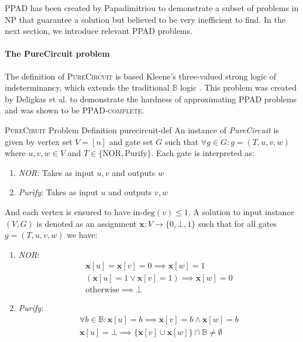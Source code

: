 \textsc{PPAD} has been created by Papadimitriou \cite{papadimitriou_ComplexityParityArgument_1994}
to demonstrate a subset of problems in \textsc{NP} that guarantee
a solution but believed to be very inefficient to find.
In the next section,
we introduce relevant \textsc{PPAD} problems.

\paragraph{The PureCircuit problem}
\label{par:pure-circ-def}

The definition of \textsc{PureCircuit} is based Kleene's three-valued strong logic of indeterminancy,
which extends the traditional $\mathbb{B}$ logic \cite{kleene_IntroductionMetamathematics_2009}.
This problem was created by Deligkas et al. \cite{deligkas_PureCircuitTightInapproximability_2024}
to demonstrate the hardness of approximating \textsc{PPAD} problems and was shown to be \textsc{PPAD-complete}.


\begin{definitionbox}{\textsc{PureCiruit} Problem Definition \cite{deligkas_PureCircuitTightInapproximability_2024}}{purecircuit-def}
An instance of \textit{PureCircuit} is given by vertex set $V= [n]$ and gate set $G$ such that
$\forall g \in G: g=(T,u,v,w)$ where $u,v,w \in V$ and $T \in \{\text{NOR}, \text{Purify}\}$.
Each gate is interpreted as:
\begin{enumerate}
    \item \textit{NOR}: Takes as input $u,v$ and outputs $w$
    \item \textit{Purify}: Takes as input $u$ and outputs $v,w$
\end{enumerate}
And each vertex is ensured to have $\text{in-deg}(v) \leq 1$.
A solution to input instance $(V,G)$ is denoted as an assignment $\mathbf{x} : V \to \{0, \bot, 1\}$
such that for all gates $g = (T,u,v,w)$ we have:
\begin{enumerate}
    \item \textit{NOR}:
       \begin{gather*}
            \mathbf{x}[u] = \mathbf{x}[v] = 0 \implies \mathbf{x}[w] = 1\\
            (\mathbf{x}[u] =1 \vee \mathbf{x}[v] =1) \implies \mathbf{x}[w] = 0 \\
            \text{otherwise} \implies \bot
        \end{gather*}

    \item \textit{Purify}: 
       \begin{gather*}
           \forall b \in \mathbb{B}: \mathbf{x}[u] = b \implies \mathbf{x}[v] = b \wedge \mathbf{x}[w] =  b\\
           \mathbf{x}[u] = \bot \implies \{\mathbf{x}[v] \cup \mathbf{x}[w] \} \cap \mathbb{B}\neq \emptyset
        \end{gather*}
\end{enumerate}
\end{definitionbox}

